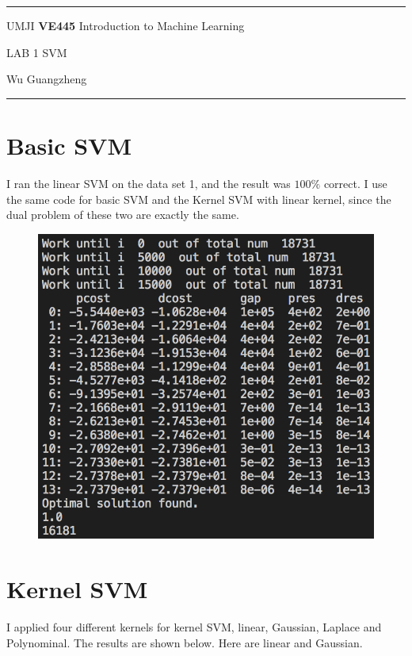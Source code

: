 \documentclass[12pt]{article}
\begin{document}
\rule[0.25\baselineskip]{\textwidth}{1pt}

\begin{center}

\vspace{0.25cm}

UMJI \textbf{VE445} Introduction to Machine Learning

\vspace{0.5cm}

\large{LAB 1 SVM}

\vspace{0.5cm}

Wu Guangzheng

\end{center}

\rule[0.25\baselineskip]{\textwidth}{1pt}

\section{Basic SVM}

\qquad I ran the linear SVM on the data set 1, and the result was $100\%$ correct. I use the same code for basic SVM and the Kernel SVM with linear kernel, since the dual problem of these two are exactly the same.

\begin{figure}[H]
\centering
\includegraphics[width=0.5\linewidth]{Linear.png}
\end{figure}

\section{Kernel SVM}

\qquad I applied four different kernels for kernel SVM, linear, Gaussian, Laplace and Polynominal. The results are shown below. Here are linear and Gaussian.
\end{document}
